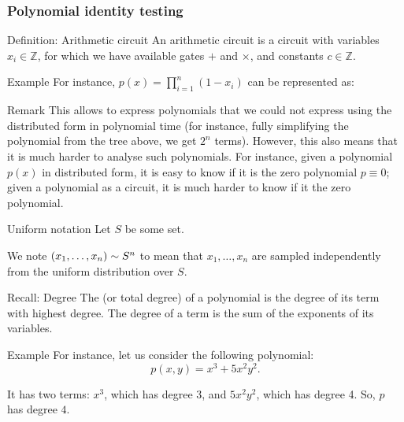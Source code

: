 \documentclass[a4paper]{article}
\begin{document}
\subsubsection{Polynomial identity testing}

\begin{parag}{Definition: Arithmetic circuit}
    An arithmetic circuit is a circuit with variables $x_i \in \mathbb{Z}$, for which we have available gates $+$ and $\times $, and constants $c \in \mathbb{Z}$.

    \begin{subparag}{Example}
        For instance, $p\left(x\right) = \prod_{i=1}^{n} \left(1- x_i\right)$ can be represented as:
    \end{subparag}

    \begin{subparag}{Remark}
        This allows to express polynomials that we could not express using the distributed form in polynomial time (for instance, fully simplifying the polynomial from the tree above, we get $2^n$ terms). However, this also means that it is much harder to analyse such polynomials. For instance, given a polynomial $p\left(x\right)$ in distributed form, it is easy to know if it is the zero polynomial $p \equiv 0$; given a polynomial as a circuit, it is much harder to know if it the zero polynomial.
    \end{subparag}
\end{parag}

\begin{parag}{Uniform notation}
    Let $S$ be some set.

    We note $\left(x_1, \ldots, x_n\right) \followsdistr S^n$ to mean that $x_1, \ldots, x_n$ are sampled independently from the uniform distribution over $S$.
\end{parag}

\begin{parag}{Recall: Degree}
    The  (or total degree) of a polynomial is the degree of its term with highest degree. The degree of a term is the sum of the exponents of its variables.

    \begin{subparag}{Example}
        For instance, let us consider the following polynomial: 
        \[p\left(x, y\right) = x^3 + 5 x^2 y^2.\]
        
        It has two terms: $x^3$, which has degree $3$, and $5x^2 y^2$, which has degree 4. So, $p$ has degree $4$.
    \end{subparag}
\end{parag}
\end{document}
